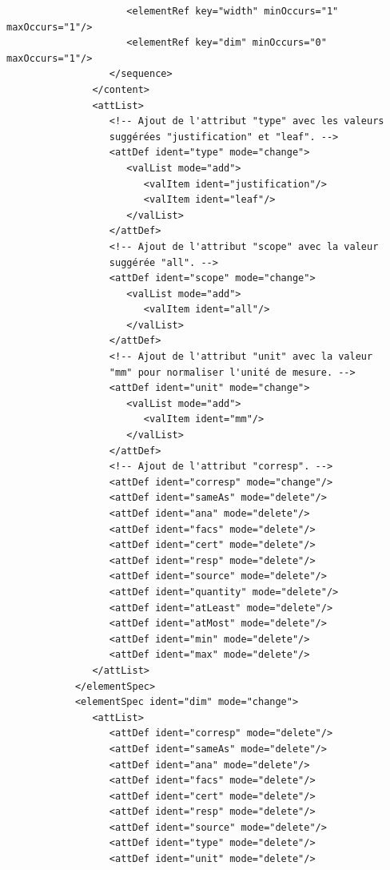 \documentclass[a4paper,12pt,twoside]{book}
\begin{document}
\begin{verbatim}
                     <elementRef key="width" minOccurs="1" maxOccurs="1"/>
                     <elementRef key="dim" minOccurs="0" maxOccurs="1"/>
                  </sequence>
               </content>
               <attList>
                  <!-- Ajout de l'attribut "type" avec les valeurs 
                  suggérées "justification" et "leaf". -->
                  <attDef ident="type" mode="change">
                     <valList mode="add">
                        <valItem ident="justification"/>
                        <valItem ident="leaf"/>
                     </valList>
                  </attDef>
                  <!-- Ajout de l'attribut "scope" avec la valeur 
                  suggérée "all". -->
                  <attDef ident="scope" mode="change">
                     <valList mode="add">
                        <valItem ident="all"/>
                     </valList>
                  </attDef>
                  <!-- Ajout de l'attribut "unit" avec la valeur 
                  "mm" pour normaliser l'unité de mesure. -->
                  <attDef ident="unit" mode="change">
                     <valList mode="add">
                        <valItem ident="mm"/>
                     </valList>
                  </attDef>
                  <!-- Ajout de l'attribut "corresp". -->
                  <attDef ident="corresp" mode="change"/>
                  <attDef ident="sameAs" mode="delete"/>
                  <attDef ident="ana" mode="delete"/>
                  <attDef ident="facs" mode="delete"/>
                  <attDef ident="cert" mode="delete"/>
                  <attDef ident="resp" mode="delete"/>
                  <attDef ident="source" mode="delete"/>
                  <attDef ident="quantity" mode="delete"/>
                  <attDef ident="atLeast" mode="delete"/>
                  <attDef ident="atMost" mode="delete"/>
                  <attDef ident="min" mode="delete"/>
                  <attDef ident="max" mode="delete"/>
               </attList>
            </elementSpec>
            <elementSpec ident="dim" mode="change">
               <attList>
                  <attDef ident="corresp" mode="delete"/>
                  <attDef ident="sameAs" mode="delete"/>
                  <attDef ident="ana" mode="delete"/>
                  <attDef ident="facs" mode="delete"/>
                  <attDef ident="cert" mode="delete"/>
                  <attDef ident="resp" mode="delete"/>
                  <attDef ident="source" mode="delete"/>
                  <attDef ident="type" mode="delete"/>
                  <attDef ident="unit" mode="delete"/>

\end{verbatim}
\end{document}
